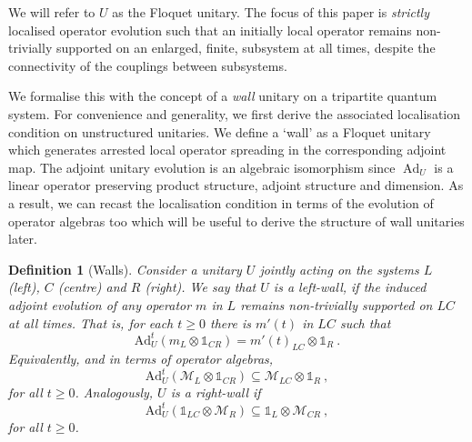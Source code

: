 \documentclass[11pt, twocolumn, floatfix, superscriptaddress, aps, prb, raggedbottom]{revtex4-2}
\newtheorem{definition}{Definition}[section]
\newcommand\lluis[1]{\textcolor{brown}{#1}}
\DeclareMathOperator{\Ad}{Ad}
\begin{document}
\noindent We will refer to $U$ as the Floquet unitary. 
 The focus of this paper is \emph{strictly} localised operator evolution such that an initially local operator remains non-trivially supported on an enlarged, finite, subsystem at all times, despite the connectivity of the couplings between subsystems.
 
We formalise this with the concept of a \textit{wall} unitary on a tripartite quantum system. For convenience and generality, we first derive the associated localisation condition on unstructured unitaries. We define a \enquote*{wall} as a Floquet unitary which generates arrested local operator spreading in the corresponding adjoint map. The adjoint unitary evolution is an algebraic isomorphism since $\Ad_U$ is a linear operator preserving product structure, adjoint structure and dimension. As a result, we can recast the localisation condition in terms of the evolution of operator algebras too which will be useful to derive the structure of wall unitaries later.



\begin{definition}[Walls]
  Consider a unitary $U$ jointly acting on the systems $L$ (left), $C$ (centre) and $R$ (right). We say that $U$ is a \textit{left-wall}, if the induced adjoint evolution of any operator $m$ in $L$ remains non-trivially supported on $LC$ at all times. That is,  for each $t\geq 0$ there is $m'(t)$ in $LC$ such that 
  \begin{equation}
    \mathrm{Ad}_U^t \left( m_L \otimes \mathds{1}_{CR}  \right) = m'(t)_{LC} \otimes \mathds{1}_{R}\ .
  \end{equation}
  Equivalently, and in terms of operator algebras,
  \begin{equation}
    \mathrm{Ad}_U^t \left( \mathcal M_L \otimes \mathds{1}_{CR}  \right) \subseteq  \mathcal M_{LC} \otimes \mathds{1}_{R}\ ,
  \end{equation}
  for all $t\geq 0$. Analogously, $U$ is a \textit{right-wall} if   
    \begin{equation}
        \mathrm{Ad}_U^t \left(\mathds{1}_{LC}   \otimes \mathcal M_R \right) \subseteq \mathds{1}_{L} \otimes \mathcal M_{CR}\ ,
      \end{equation}
  for all $t\geq 0$.
  \label{def:walls}
\end{definition}
\end{document}
